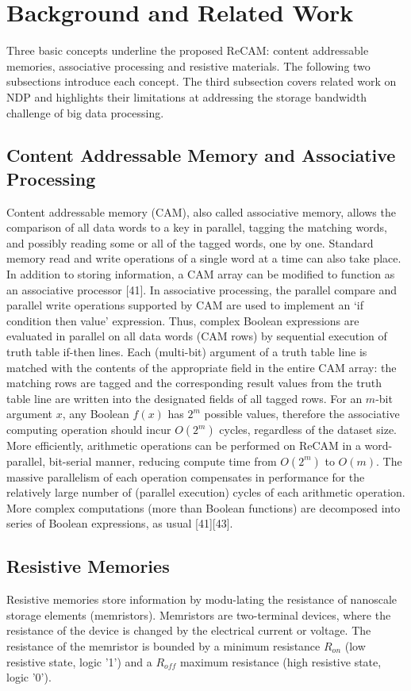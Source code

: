 \documentclass{superfri}
\begin{document}
\section{Background and Related Work}
\label{sec:backgroud}
Three basic concepts underline the proposed ReCAM: content addressable memories, associative processing and resistive materials. The following two subsections introduce each concept. The third subsection covers related work on NDP and highlights their limitations at addressing the storage bandwidth challenge of big data processing.

\subsection{Content Addressable Memory and Associative Processing}
\label{sec:CAMandAP}
Content addressable memory (CAM), also called associative memory, allows the comparison of all data words to a key in parallel, tagging the matching words, and possibly reading some or all of the tagged words, one by one. Standard memory read and write operations of a single word at a time can also take place.
In addition to storing information, a CAM array can be modified to function as an associative processor \cite{foster1976content}‎[41]. In associative processing, the parallel compare and parallel write operations supported by CAM are used to implement an ‘if condition then value' expression. Thus, complex Boolean expressions are evaluated in parallel on all data words (CAM rows) by sequential execution of truth table if-then lines. Each (multi-bit) argument of a truth table line is matched with the contents of the appropriate field in the entire CAM array: the matching rows are tagged and the corresponding result values from the truth table line are written into the designated fields of all tagged rows. 
For an $m$-bit argument $x$, any Boolean $f(x)$ has $2^m$ possible values, therefore the associative computing operation should incur $O(2^m)$ cycles, regardless of the dataset size. More efficiently, arithmetic operations can be performed on ReCAM in a word-parallel, bit-serial manner, reducing compute time from $O(2^m)$ to $O(m)$. The massive parallelism of each operation compensates in performance for the relatively large number of (parallel execution) cycles of each arithmetic operation.
More complex computations (more than Boolean functions) are decomposed into series of Boolean expressions, as usual [41][43]. 

\subsection{Resistive Memories}
\label{sec:resistive_memories}
Resistive memories store information by modu-lating the resistance of nanoscale storage elements (memristors). Memristors are two-terminal devices, where the resistance of the device is changed by the electrical current or voltage. The resistance of the memristor is bounded by a minimum resistance $R_{on}$ (low resistive state, logic '1') and a $R_{off}$ maximum resistance (high resistive state, logic '0').
\end{document}
